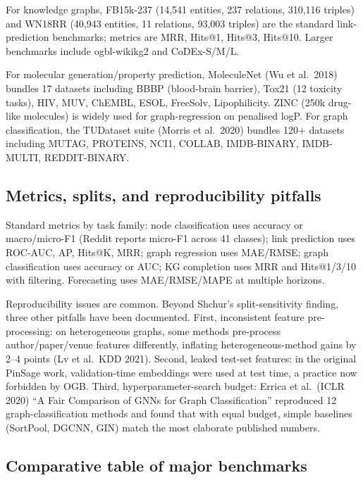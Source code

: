 \documentclass{article}
\begin{document}
For knowledge graphs, FB15k-237 (14,541 entities, 237 relations, 310,116 triples) and WN18RR (40,943 entities, 11 relations, 93,003 triples) are the standard link-prediction benchmarks; metrics are MRR, Hits@1, Hits@3, Hits@10. Larger benchmarks include ogbl-wikikg2 and CoDEx-S/M/L.

For molecular generation/property prediction, MoleculeNet (Wu et al.~2018) bundles 17 datasets including BBBP (blood-brain barrier), Tox21 (12 toxicity tasks), HIV, MUV, ChEMBL, ESOL, FreeSolv, Lipophilicity. ZINC (250k drug-like molecules) is widely used for graph-regression on penalised logP. For graph classification, the TUDataset suite (Morris et al.~2020) bundles 120+ datasets including MUTAG, PROTEINS, NCI1, COLLAB, IMDB-BINARY, IMDB-MULTI, REDDIT-BINARY.

\subsection{Metrics, splits, and reproducibility pitfalls}\label{metrics-splits-and-reproducibility-pitfalls}

Standard metrics by task family: node classification uses accuracy or macro/micro-F1 (Reddit reports micro-F1 across 41 classes); link prediction uses ROC-AUC, AP, Hits@K, MRR; graph regression uses MAE/RMSE; graph classification uses accuracy or AUC; KG completion uses MRR and Hits@1/3/10 with filtering. Forecasting uses MAE/RMSE/MAPE at multiple horizons.

Reproducibility issues are common. Beyond Shchur's split-sensitivity finding, three other pitfalls have been documented. First, inconsistent feature pre-processing: on heterogeneous graphs, some methods pre-process author/paper/venue features differently, inflating heterogeneous-method gains by 2--4 points (Lv et al.~KDD 2021). Second, leaked test-set features: in the original PinSage work, validation-time embeddings were used at test time, a practice now forbidden by OGB. Third, hyperparameter-search budget: Errica et al.~(ICLR 2020) ``A Fair Comparison of GNNs for Graph Classification'' reproduced 12 graph-classification methods and found that with equal budget, simple baselines (SortPool, DGCNN, GIN) match the most elaborate published numbers.

\subsection{Comparative table of major benchmarks}\label{comparative-table-of-major-benchmarks}
\end{document}
